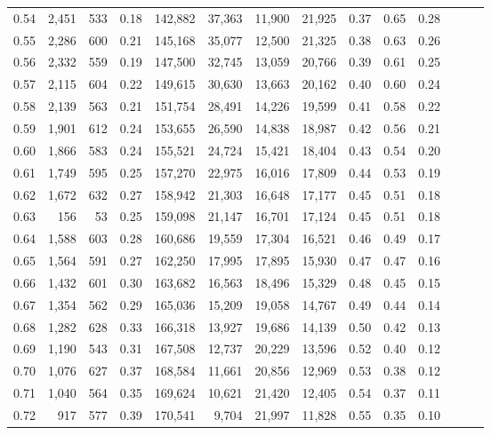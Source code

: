 \begin{tabular}{rrrrrrrrrrrrrr}
0.54 &  2,451 &  533 &  0.18 &  142,882 &   37,363 &  11,900 &  21,925 &  0.37 &  0.65 &      0.28 \\
0.55 &  2,286 &  600 &  0.21 &  145,168 &   35,077 &  12,500 &  21,325 &  0.38 &  0.63 &      0.26 \\
0.56 &  2,332 &  559 &  0.19 &  147,500 &   32,745 &  13,059 &  20,766 &  0.39 &  0.61 &      0.25 \\
0.57 &  2,115 &  604 &  0.22 &  149,615 &   30,630 &  13,663 &  20,162 &  0.40 &  0.60 &      0.24 \\
0.58 &  2,139 &  563 &  0.21 &  151,754 &   28,491 &  14,226 &  19,599 &  0.41 &  0.58 &      0.22 \\
0.59 &  1,901 &  612 &  0.24 &  153,655 &   26,590 &  14,838 &  18,987 &  0.42 &  0.56 &      0.21 \\
0.60 &  1,866 &  583 &  0.24 &  155,521 &   24,724 &  15,421 &  18,404 &  0.43 &  0.54 &      0.20 \\
0.61 &  1,749 &  595 &  0.25 &  157,270 &   22,975 &  16,016 &  17,809 &  0.44 &  0.53 &      0.19 \\
0.62 &  1,672 &  632 &  0.27 &  158,942 &   21,303 &  16,648 &  17,177 &  0.45 &  0.51 &      0.18 \\
0.63 &    156 &   53 &  0.25 &  159,098 &   21,147 &  16,701 &  17,124 &  0.45 &  0.51 &      0.18 \\
0.64 &  1,588 &  603 &  0.28 &  160,686 &   19,559 &  17,304 &  16,521 &  0.46 &  0.49 &      0.17 \\
0.65 &  1,564 &  591 &  0.27 &  162,250 &   17,995 &  17,895 &  15,930 &  0.47 &  0.47 &      0.16 \\
0.66 &  1,432 &  601 &  0.30 &  163,682 &   16,563 &  18,496 &  15,329 &  0.48 &  0.45 &      0.15 \\
0.67 &  1,354 &  562 &  0.29 &  165,036 &   15,209 &  19,058 &  14,767 &  0.49 &  0.44 &      0.14 \\
0.68 &  1,282 &  628 &  0.33 &  166,318 &   13,927 &  19,686 &  14,139 &  0.50 &  0.42 &      0.13 \\
0.69 &  1,190 &  543 &  0.31 &  167,508 &   12,737 &  20,229 &  13,596 &  0.52 &  0.40 &      0.12 \\
0.70 &  1,076 &  627 &  0.37 &  168,584 &   11,661 &  20,856 &  12,969 &  0.53 &  0.38 &      0.12 \\
0.71 &  1,040 &  564 &  0.35 &  169,624 &   10,621 &  21,420 &  12,405 &  0.54 &  0.37 &      0.11 \\
0.72 &    917 &  577 &  0.39 &  170,541 &    9,704 &  21,997 &  11,828 &  0.55 &  0.35 &      0.10 \\

\end{tabular}
